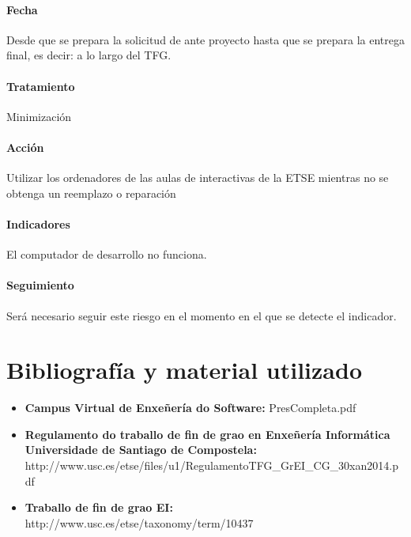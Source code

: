 \documentclass[10pt,a4paper]{article}
\begin{document}
				\paragraph{Fecha} Desde que se prepara la solicitud de ante proyecto hasta que se prepara la entrega final, es decir: a lo largo del TFG.  %
				\paragraph{Tratamiento} Minimización %
				\paragraph{Acción} Utilizar los ordenadores de las aulas de interactivas de la ETSE mientras no se obtenga un reemplazo o reparación%
				\paragraph{Indicadores} El computador de desarrollo no funciona.%
				\paragraph{Seguimiento}	Será necesario seguir este riesgo en el momento en el que se detecte el indicador. %

	\newpage
	\appendix
		\section{Bibliografía y material utilizado}
			\begin{itemize}
			\item \textbf{Campus Virtual de Enxeñería do Software:} PresCompleta.pdf
			\item \textbf{Regulamento do traballo de fin de grao en Enxeñería Informática Universidade de Santiago de Compostela:} http://www.usc.es/etse/files/u1/RegulamentoTFG\_GrEI\_CG\_30xan2014.pdf
			\item \textbf{Traballo de fin de grao EI:} http://www.usc.es/etse/taxonomy/term/10437
			\end{itemize}
			
\end{document}
